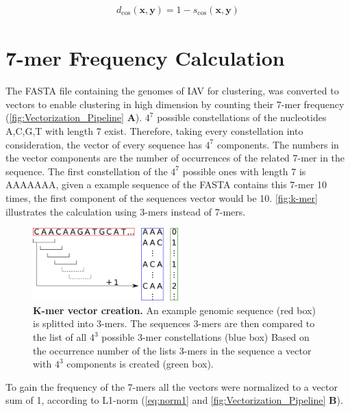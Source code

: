 \begin{equation}\label{eq:cos}
    \begin{aligned}
        d_{\text{cos}}(\mathbf{x}, \mathbf{y}) = 1 - s_{\text{cos}}(\mathbf{x}, \mathbf{y})
    \end{aligned}
\end{equation}

\section{7-mer Frequency Calculation} \label{sec:Frequency}

The FASTA file containing the genomes of \gls{IAV} for clustering, was converted to vectors to enable clustering in high dimension by counting their 7-mer frequency (\autoref{fig:Vectorization_Pipeline} \textsf{\textbf{A}}). $4^7$ possible constellations of the nucleotides A,C,G,T with length 7 exist. Therefore, taking every constellation into consideration, the vector of every sequence has $4^7$ components. The numbers in the vector components are the number of occurrences of the related 7-mer in the sequence. The first constellation of the $4^7$ possible ones with length 7 is AAAAAAA, given a example sequence of the FASTA contains this 7-mer 10 times, the first component of the sequences vector would be 10. \autoref{fig:k-mer} illustrates the calculation using 3-mers instead of 7-mers.

\begin{figure}[!hbt]
    \centering
    \includegraphics[width=0.5\textwidth]{Graphics/Kmer.pdf}
    \caption[K-mer vector creation]{\textbf{K-mer vector creation.} An example genomic sequence (red box) is splitted into 3-mers. The sequences 3-mers are then compared to the list of all $4^3$ possible 3-mer constellations (blue box) Based on the occurrence number of the lists 3-mers in the sequence a vector with $4^3$ components is created (green box).}
    \label{fig:k-mer}
\end{figure}

To gain the frequency of the 7-mers all the vectors were normalized to a vector sum of 1, according to L1-norm (\autoref{eq:norm1} and \autoref{fig:Vectorization_Pipeline} \textsf{\textbf{B}}). 

